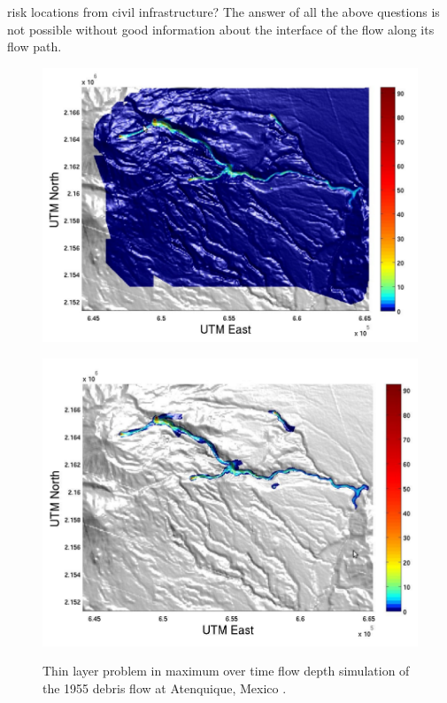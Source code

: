 \documentclass[review]{elsarticle}
\begin{document}
risk locations from civil infrastructure? 
The answer of all the above questions is not possible without good information about the interface of the flow along its flow path.
\begin{figure}[t]
  \begin{minipage}[b]{.45\textwidth}
    \centering
    \includegraphics[width=1\textwidth]{IMAGES/rupps1.png}  
     \label{thinlayerproblem_a}
  \end{minipage}
\hspace{0.5cm}
  \begin{minipage}[b]{.45\textwidth}
    \centering
    \includegraphics[width=1\textwidth]{IMAGES/rupps2.png}
    \label{thinlayerproblem_b}
   \end{minipage}
  \caption{Thin layer problem in maximum over time flow depth simulation of the 1955 debris flow at Atenquique, Mexico \cite{Dalbey2009}.}
  \label{thinlayerproblem}
\end{figure}
\end{document}
